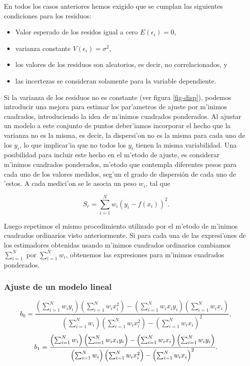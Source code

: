 \documentclass[a4paper]{report}
\begin{document}
En todos los casos anteriores hemos exigido que se cumplan las siguientes condiciones para los residuos:
\begin{itemize}
\item Valor esperado de los residos igual a cero $E(\epsilon_i)=0$, 
\item varianza constante $V(\epsilon_i)=\sigma^{2}$, 
\item los valores de los residuos son aleatorios, es decir, no correlacionados, y 
\item las incertezas se consideran solamente para la variable dependiente. 
\end{itemize}

Si la varianza de los residuos no es constante (ver figura \ref{fig-disp}), podemos introducir una mejora para estimar los par'ametros de ajuste por m'inimos cuadrados, introduciendo la idea de m'inimos cuadrados ponderados.
Al ajustar un modelo a este conjunto de puntos deber'iamos incorporar el hecho que la varianza no es la misma, es decir, la dispersi'on no es la misma para cada uno de los $y_{i}$, lo que implicar'ia que no todos los $y_{i}$ tienen la misma variabilidad.
Una posibilidad para incluir este hecho en el m'etodo de ajuste, es considerar m'inimos cuadrados ponderados, m'etodo que contempla diferentes pesos para cada uno de los valores medidos, seg'un el grado de dispersión de cada uno de 'estos.
A cada medici'on se le asocia un peso $w_{i}$, tal que

\begin{equation}
S_{r}=\sum_{i=1}^N w_{i}\left(y_i-f(x_i)\right)^2.
\end{equation}

Luego repetimos el mismo procedimiento utilizado por el m'etodo de m'inimos cuadrados ordinarios visto anteriormente. Si para cada una de las expresi'ones de los estimadores obtenidas usando m'inimos cuadrados ordinarios cambiamos $\sum_{i=1}^N$ por $\sum_{i=1}^Nw_{i}$, obtenemos las expresiones para m'inimos cuadrados ponderados.

\subsubsection{Ajuste de un modelo lineal}
\begin{equation}
b_0 = \frac{\left(\sum_{i=1}^N w_{i}y_{i}\right)\left(\sum_{i=1}^N w_{i}x_{i}^2\right)-\left(\sum_{i=1}^N w_{i}x_{i} y_{i}\right)\left(\sum_{i=1}^N w_{i}x_{i}\right)}
{\left(\sum_{i=1}^N w_{i}\right)\left(\sum_{i=1}^N w_{i}x_{i}^{2}\right)-\left(\sum_{i=1}^N w_{i}x_{i}\right)^{2}},
\end{equation}
\begin{equation}
\\
b_1 =  \frac{\left(\sum_{i=1}^N w_{i}\right)\left(\sum_{i=1}^N w_{i}x_{i} y_{i}\right)-\left(\sum_{i=1}^N w_{i}x_{i}\right)\left(\sum_{i=1}^N w_{i}y_{i}\right)}
{\left(\sum_{i=1}^N w_{i}\right)\left(\sum_{i=1}^N w_{i}x_{i}^{2}\right)-\left(\sum_{i=1}^N w_{i}x_{i}\right)^{2}}. 
\end{equation}
\end{document}
